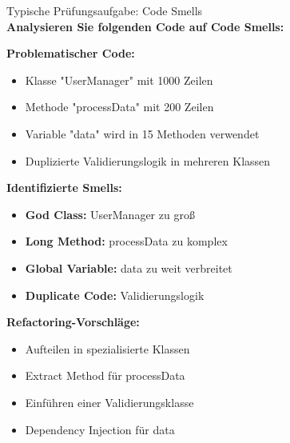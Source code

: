 \begin{example2}{Typische Prüfungsaufgabe: Code Smells}\\
\textbf{Analysieren Sie folgenden Code auf Code Smells:}

\textbf{Problematischer Code:}
\begin{itemize}
    \item Klasse "UserManager" mit 1000 Zeilen
    \item Methode "processData" mit 200 Zeilen
    \item Variable "data" wird in 15 Methoden verwendet
    \item Duplizierte Validierungslogik in mehreren Klassen
\end{itemize}

\textbf{Identifizierte Smells:}
\begin{itemize}
    \item \textbf{God Class:} UserManager zu groß
    \item \textbf{Long Method:} processData zu komplex
    \item \textbf{Global Variable:} data zu weit verbreitet
    \item \textbf{Duplicate Code:} Validierungslogik
\end{itemize}

\textbf{Refactoring-Vorschläge:}
\begin{itemize}
    \item Aufteilen in spezialisierte Klassen
    \item Extract Method für processData
    \item Einführen einer Validierungsklasse
    \item Dependency Injection für data
\end{itemize}
\end{example2}




